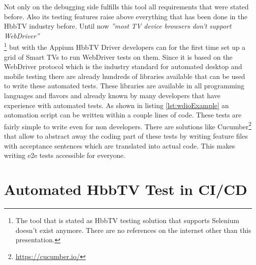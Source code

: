 Not only on the debugging side fulfills this tool all requirements that were stated before. Also its testing features raise above everything that has been done in the HbbTV industry before. Until now \textit{''most TV device browsers don’t support WebDriver''}\\ \cite{sengo}\footnote{The tool that is stated as HbbTV testing solution that supports Selenium doesn't exist anymore. There are no references on the internet other than this presentation.} but with the Appium HbbTV Driver developers can for the first time set up a grid of Smart TVs to run WebDriver tests on them. Since it is based on the WebDriver protocol which is the industry standard for automated desktop and mobile testing there are already hundreds of libraries available that can be used to write these automated tests. These libraries are available in all programming languages and flavors and already known by many developers that have experience with automated tests. As shown in listing \ref{lst:wdioExample} an automation script can be written within a couple lines of code. These tests are fairly simple to write even for non developers. There are solutions like Cucumber\footnote{\url{https://cucumber.io/}} that allow to abstract away the coding part of these tests by writing feature files with acceptance sentences which are translated into actual code. This makes writing e2e tests accessible for everyone.

\section{Automated HbbTV Test in CI/CD}

